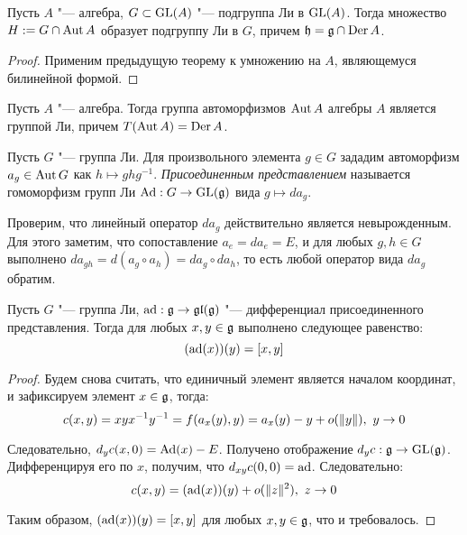\begin{corollary}
	Пусть $A$ "--- алгебра, $G \subset \operatorname{GL}(A)$ "--- подгруппа Ли в $\operatorname{GL}(A)$. Тогда множество $H := G \cap \operatorname{Aut}{A}$ образует подгруппу Ли в $G$, причем $\mathfrak h = \mathfrak g \cap \operatorname{Der}{A}$.
\end{corollary}

\begin{proof}
	Применим предыдущую теорему к умножению на $A$, являющемуся билинейной формой.
\end{proof}

\begin{corollary}
	Пусть $A$ "--- алгебра. Тогда группа автоморфизмов $\operatorname{Aut}{A}$ алгебры $A$ является группой Ли, причем $T(\operatorname{Aut}{A}) = \operatorname{Der}{A}$.
\end{corollary}

\begin{definition}
	Пусть $G$ "--- группа Ли. Для произвольного элемента $g \in G$ зададим автоморфизм $a_g \in \operatorname{Aut}{G}$ как $h \mapsto ghg^{-1}$. \textit{Присоединенным представлением} называется гомоморфизм групп Ли $\operatorname{Ad}: G \to \operatorname{GL}(\mathfrak g)$ вида $g \mapsto da_g$.
\end{definition}

\begin{note}
	Проверим, что линейный оператор $da_g$ действительно является невырожденным. Для этого заметим, что сопоставление $a_e = da_e = E$, и для любых $g, h \in G$ выполнено $da_{gh} = d(a_g \circ a_h) = da_g \circ da_h$, то есть любой оператор вида $da_g$ обратим.
\end{note}

\begin{theorem}
	Пусть $G$ "--- группа Ли, $\operatorname{ad}: \mathfrak g \to \mathfrak{gl}(\mathfrak g)$ "--- дифференциал присоединенного представления. Тогда для любых $x, y \in \mathfrak{g}$ выполнено следующее равенство:
	\[(\operatorname{ad} (x))(y) = [x, y]\]
\end{theorem}

\begin{proof}
	Будем снова считать, что единичный элемент является началом координат, и зафиксируем элемент $x \in \mathfrak{g}$, тогда:
	\[c(x, y) = xyx^{-1}y^{-1} = f{(a_x(y), y)} = a_x(y) - y + o(\|y\|),~y \to 0\]
	
	Следовательно, $d_yc(x, 0) = \operatorname{Ad}(x) - E$. Получено отображение $d_yc: \mathfrak g \to \operatorname{GL}(\mathfrak g)$. Дифференцируя его по $x$, получим, что $d_{xy}c(0, 0) = \operatorname{ad}$. Следовательно:
	\[c(x, y) = (\operatorname{ad} (x))(y) + o(\|z\|^2),~z \to 0\]
	
	Таким образом, $(\operatorname{ad} (x))(y) = [x, y]$ для любых $x, y \in \mathfrak g$, что и требовалось.
\end{proof}


